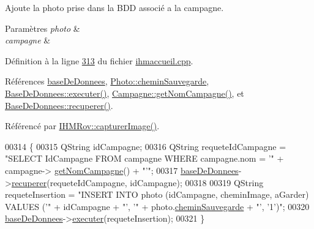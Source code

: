 Ajoute la photo prise dans la B\+DD associé a la campagne. 


\begin{DoxyParams}{Paramètres}
{\em photo} & \\
\hline
{\em campagne} & \\
\hline
\end{DoxyParams}


Définition à la ligne \hyperlink{ihmaccueil_8cpp_source_l00313}{313} du fichier \hyperlink{ihmaccueil_8cpp_source}{ihmaccueil.\+cpp}.



Références \hyperlink{ihmaccueil_8h_source_l00040}{base\+De\+Donnees}, \hyperlink{ihmalbumphoto_8h_source_l00025}{Photo\+::chemin\+Sauvegarde}, \hyperlink{basededonnees_8cpp_source_l00104}{Base\+De\+Donnees\+::executer()}, \hyperlink{campagne_8cpp_source_l00019}{Campagne\+::get\+Nom\+Campagne()}, et \hyperlink{basededonnees_8cpp_source_l00139}{Base\+De\+Donnees\+::recuperer()}.



Référencé par \hyperlink{ihmrov_8cpp_source_l00179}{I\+H\+M\+Rov\+::capturer\+Image()}.


\begin{DoxyCode}
00314 \{
00315     QString idCampagne;
00316     QString requeteIdCampagne = \textcolor{stringliteral}{"SELECT IdCampagne FROM campagne WHERE campagne.nom = '"} + campagne->
      \hyperlink{class_campagne_a99a682fcb8e5a3f8c2aff7a44eb2c930}{getNomCampagne}() + \textcolor{stringliteral}{"'"};
00317     \hyperlink{class_i_h_m_accueil_ab56d9846c071396a92f88272880e2c1f}{baseDeDonnees}->\hyperlink{class_base_de_donnees_a77539baad389f5acf754cd2cd452403e}{recuperer}(requeteIdCampagne, idCampagne);
00318 
00319     QString requeteInsertion = \textcolor{stringliteral}{"INSERT INTO photo (idCampagne, cheminImage, aGarder) VALUES ('"} + 
      idCampagne + \textcolor{stringliteral}{"', '"} + photo.\hyperlink{struct_photo_a3c28eb9ad160b65deb46a72146a1d14f}{cheminSauvegarde} + \textcolor{stringliteral}{"', '1')"};
00320     \hyperlink{class_i_h_m_accueil_ab56d9846c071396a92f88272880e2c1f}{baseDeDonnees}->\hyperlink{class_base_de_donnees_aa8de5f8f8bb17edc43f5c0ee33712081}{executer}(requeteInsertion);
00321 \}
\end{DoxyCode}
\mbox{\label{class_i_h_m_accueil_a5d38917dbe88751ee966834e1f6c558e}} 
